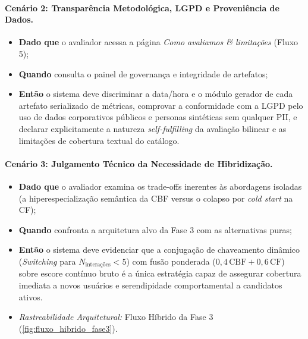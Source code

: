 \paragraph{Cenário 2: Transparência Metodológica, LGPD e Proveniência de Dados.}
\begin{itemize}[leftmargin=1.5em, itemsep=2pt]
    \item \textbf{Dado que} o avaliador acessa a página \textit{Como avaliamos \& limitações} (Fluxo 5);
    \item \textbf{Quando} consulta o painel de governança e integridade de artefatos;
    \item \textbf{Então} o sistema deve discriminar a data/hora e o módulo gerador de cada artefato serializado de métricas, comprovar a conformidade com a LGPD pelo uso de dados corporativos públicos e personas sintéticas sem qualquer PII, e declarar explicitamente a natureza \textit{self-fulfilling} da avaliação bilinear e as limitações de cobertura textual do catálogo.
\end{itemize}

\paragraph{Cenário 3: Julgamento Técnico da Necessidade de Hibridização.}
\begin{itemize}[leftmargin=1.5em, itemsep=2pt]
    \item \textbf{Dado que} o avaliador examina os trade-offs inerentes às abordagens isoladas (a hiperespecialização semântica da CBF versus o colapso por \textit{cold start} na CF);
    \item \textbf{Quando} confronta a arquitetura alvo da Fase 3 com as alternativas puras;
    \item \textbf{Então} o sistema deve evidenciar que a conjugação de chaveamento dinâmico (\textit{Switching} para $N_{\text{interações}} < 5$) com fusão ponderada ($0{,}4\,\text{CBF} + 0{,}6\,\text{CF}$) sobre escore contínuo bruto é a única estratégia capaz de assegurar cobertura imediata a novos usuários e serendipidade comportamental a candidatos ativos.
    \item \textit{Rastreabilidade Arquitetural:} Fluxo Híbrido da Fase 3 (\ref{fig:fluxo_hibrido_fase3}).
\end{itemize}

